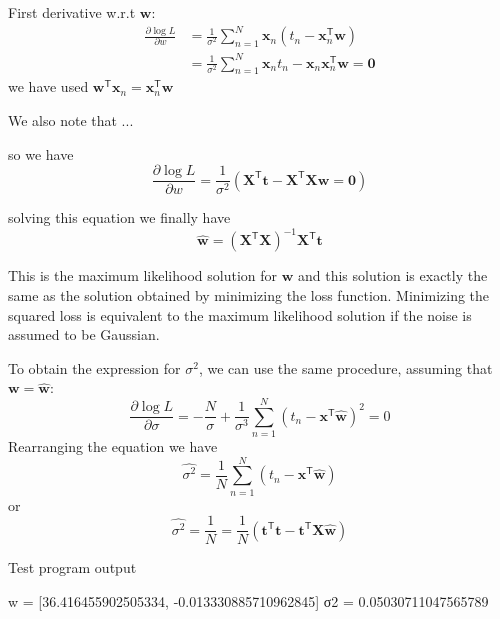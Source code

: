 \documentclass[a4paper,11pt]{article} %
\begin{document}
First derivative w.r.t $\mathbf{w}$:
\begin{align*}
\frac{\partial\log L}{\partial w} & = \frac{1}{\sigma^2}
\sum_{n=1}^{N} \mathbf{x}_{n} \left( t_{n} - \mathbf{x}^{\mathsf{T}}_{n} \mathbf{w} \right) \\
& = \frac{1}{\sigma^2}\sum_{n=1}^{N} \mathbf{x}_{n} t_{n} - 
\mathbf{x}_{n}\mathbf{x}_{n}^{\mathsf{T}}\mathbf{w}
= \mathbf{0}
\end{align*}
we have used
$\mathbf{w}^{\mathsf{T}}\mathbf{x}_{n} = \mathbf{x}_{n}^{\mathsf{T}}\mathbf{w}$

We also note that ...

so we have
\begin{equation}
\frac{\partial\log L}{\partial w} = \frac{1}{\sigma^2}\left(
\mathbf{X}^{\mathsf{T}}\mathbf{t} - \mathbf{X}^{\mathsf{T}}\mathbf{X}\mathbf{w} = \mathbf{0}
\right)
\end{equation}

solving this equation we finally have
\begin{equation}
\hat{\mathbf{w}} = \left(\mathbf{X}^{\mathsf{T}}\mathbf{X}\right)^{-1}
\mathbf{X}^{\mathsf{T}}\mathbf{t}
\end{equation}

This is the maximum likelihood solution for $\mathbf{w}$ and this solution is exactly
the same as the solution obtained by minimizing the loss function.
Minimizing the squared loss is equivalent
to the maximum likelihood solution if the noise is assumed to be Gaussian.

To obtain the expression for $\sigma^2$, we can use the same procedure,
assuming that $\mathbf{w} = \hat{\mathbf{w}}$:
\begin{equation}
\frac{\partial \log L}{\partial \sigma} = -\frac{N}{\sigma} +
\frac{1}{\sigma^3}\sum_{n=1}^{N} (t_{n} - \mathbf{x}^{\mathsf{T}}\hat{\mathbf{w}})^2 = 0
\end{equation}
Rearranging the equation we have
\begin{equation}
\hat{\sigma^2} = \frac{1}{N}\sum_{n=1}^{N} (t_n - \mathbf{x}^{\mathsf{T}}\hat{\mathbf{w}})
\end{equation}
or
\begin{equation}
\hat{\sigma^2} = \frac{1}{N} = \frac{1}{N}\left(
\mathbf{t}^{\mathsf{T}}\mathbf{t} - \mathbf{t}^{\mathsf{T}}\mathbf{X}\hat{\mathbf{w}}
\right)
\end{equation}

Test program output
\begin{textcode}
w = [36.416455902505334, -0.013330885710962845]
σ2 = 0.05030711047565789
\end{textcode}
\end{document}
